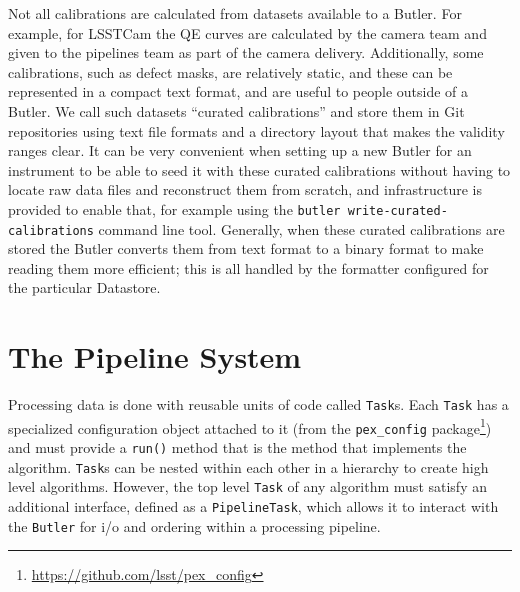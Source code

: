 \documentclass[]{spie}
\begin{document}
Not all calibrations are calculated from datasets available to a Butler.
For example, for LSSTCam the QE curves are calculated by the camera team and given to the pipelines team as part of the camera delivery.
Additionally, some calibrations, such as defect masks, are relatively static, and these can be represented in a compact text format, and are useful to people outside of a Butler.
We call such datasets ``curated calibrations'' and store them in Git repositories using text file formats and a directory layout that makes the validity ranges clear.
It can be very convenient when setting up a new Butler for an instrument to be able to seed it with these curated calibrations without having to locate raw data files and reconstruct them from scratch, and infrastructure is provided to enable that, for example using the \texttt{butler write-curated-calibrations} command line tool.
Generally, when these curated calibrations are stored the Butler converts them from text format to a binary format to make reading them more efficient; this is all handled by the formatter configured for the particular Datastore.

\section{The Pipeline System}

\setcounter{footnote}{0}  %

Processing data is done with reusable units of code called \texttt{Task}s.
Each \texttt{Task} has a specialized configuration object attached to it (from the \texttt{pex\_config} package\footnote{\url{https://github.com/lsst/pex_config}}) and must provide a \texttt{run()} method that is the method that implements the algorithm.
\texttt{Task}s can be nested within each other in a hierarchy to create high level algorithms.
However, the top level \texttt{Task} of any algorithm must satisfy an additional interface, defined as a \texttt{PipelineTask}, which allows it to interact with the \texttt{Butler} for i/o and ordering within a processing pipeline.
\end{document}
